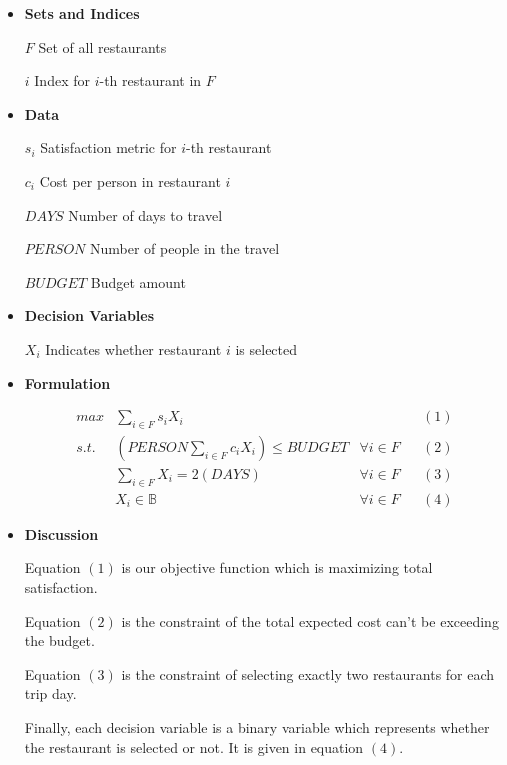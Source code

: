\documentclass{article}
\newcommand\tabb{\tabto{10em}}
\newcommand\idt{\hspace{2mm}}
\begin{document}
	\begin{itemize}
		\item \textbf{Sets and Indices} 
		
		\idt $F$ \tabb Set of all restaurants
		
		\idt $i$ \tabb Index for $i$-th restaurant in $F$
		
		\item \textbf{Data}
		
		\idt $s_{i}$ \tabb Satisfaction metric for $i$-th restaurant
		
		\idt $c_{i}$ \tabb Cost per person in restaurant $i$
		
		\idt $DAYS$ \tabb Number of days to travel
		
		\idt $PERSON$ \tabb Number of people in the travel
		
		\idt $BUDGET$ \tabb Budget amount
		
		\item \textbf{Decision Variables}
		
		\idt $X_{i}$ \tabb Indicates whether restaurant $i$ is selected
		
		\item \textbf{Formulation}
		
		\[
		\begin{aligned}
			max & \sum_{i \in F} s_{i}X_{i} & & & (1) \\
			s.t. & \left(PERSON \sum_{i \in F} c_{i}X_{i} \right) \le BUDGET & \forall i \in F & & (2) \\
			& \sum_{i \in F} X_{i} = 2 (DAYS) & \forall i \in F & & (3) \\
			& X_{i} \in \mathbb{B} & \forall i \in F & & (4)
		\end{aligned}
		\]
		
		\item \textbf{Discussion}
		
		Equation $(1)$ is our objective function which is maximizing total satisfaction. 
		
		Equation $(2)$ is the constraint of the total expected cost can't be exceeding the budget. 
		
		Equation $(3)$ is the constraint of selecting exactly two restaurants for each trip day. 
		
		Finally, each decision variable is a binary variable which represents whether the restaurant is selected or not. It is given in equation $(4)$.
		
	\end{itemize}
\end{document}
